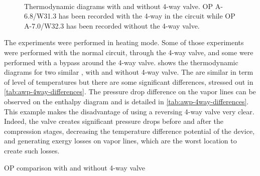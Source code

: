 \begin{figure}[htbp]
  \centering
  \hspace{1em}
  \\
  \hspace{1em}
  \caption[A-6.8/W31.3 \& A-7.0/W32.3 -- Thermodynamic diagrams with
  and without 4-way valve]{Thermodynamic diagrams with and without
    4-way valve. OP A-6.8/W31.3 has been recorded with the 4-way in
    the circuit while OP A-7.0/W32.3 has been recorded without the
    4-way valve.}
  \label{fig:awp-w-wo-4way-diagrams}
\end{figure}


The experiments were performed in heating mode. Some of those
experiments were performed with the normal circuit, through the 4-way
valve, and some were performed with a bypass around the 4-way
valve.  shows the thermodynamic
diagrams for two similar \OP{}, with and without 4-way valve. The
\OP{} are similar in term of level of temperatures but there are some
significant differences, stressed out in
\cref{tab:awp-4way-differences}. The pressure drop
difference on the vapor lines can be observed on the enthalpy diagram
and is detailed in \cref{tab:awp-4way-differences}. This example makes
the disadvantage of using a reversing 4-way valve very clear. Indeed,
the valve creates significant pressure drops before and after the
compression stages, decreasing the temperature difference potential of
the device, and generating exergy losses on vapor lines, which are the
worst location to create such losses.

\begin{table}[htbp]
  \begin{center}
    \footnotesize
    
  \end{center}
  \caption{OP comparison with and without 4-way valve}
  \label{tab:awp-4way-differences}
\end{table}


